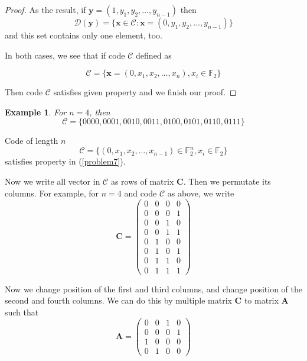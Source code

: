 \documentclass{article}
\newcommand{\FF}{\mathbb{F}}
\newtheorem{example}{Example}
\begin{document}
\begin{proof}
    As the result, if $\bm{y} = (1, y_1, y_2, \ldots, y_{n-1})$ then \[ \mathcal{D}(\bm{y}) = \{ \bm{x} \in \mathcal{C} : \bm{x} = (0, y_1, y_2, \ldots, y_{n-1}) \} \] and this set contains only one element, too.

    In both cases, we see that if code $\mathcal{C}$ defined as

    \begin{equation}
        \mathcal{C} = \{ \bm{x} = (0, x_1, x_2, \ldots, x_n), x_i \in \FF_2 \}
    \end{equation}

    Then code $\mathcal{C}$ satisfies given property and we finish our proof.
\end{proof}

\begin{example}
    For $n=4$, then \[ \mathcal{C} = \{ 0000, 0001, 0010, 0011, 0100, 0101, 0110, 0111 \} \]
\end{example}

\begin{conclusion}
    Code of length $n$ \[ \mathcal{C} = \{ (0, x_1, x_2, \ldots, x_{n-1}) \in \FF_2^n, x_i \in \FF_2 \} \] satisfies property in (\ref{problem7}).
\end{conclusion}

Now we write all vector in $\mathcal{C}$ as rows of matrix $\bm{C}$. Then we permutate its columns. For example, for $n=4$ and code $\mathcal{C}$ as above, we write 
\[ \bm{C} = \begin{pmatrix}
    0 & 0 & 0 & 0 \\
    0 & 0 & 0 & 1 \\
    0 & 0 & 1 & 0 \\
    0 & 0 & 1 & 1 \\
    0 & 1 & 0 & 0 \\
    0 & 1 & 0 & 1 \\
    0 & 1 & 1 & 0 \\
    0 & 1 & 1 & 1
\end{pmatrix} \]

Now we change position of the first and third columns, and change position of the second and fourth columns. We can do this by multiple matrix $\bm{C}$ to matrix $\bm{A}$ such that \[ \bm{A} = \begin{pmatrix}
    0 & 0 & 1 & 0 \\
    0 & 0 & 0 & 1 \\
    1 & 0 & 0 & 0 \\
    0 & 1 & 0 & 0
\end{pmatrix} \]
\end{document}

